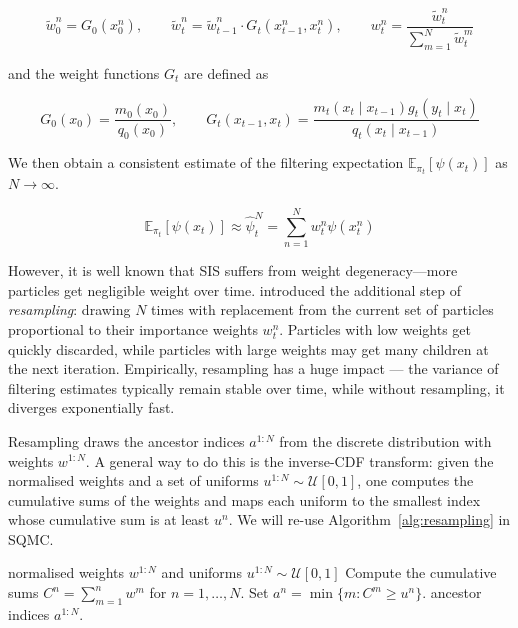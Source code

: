\begin{equation}
    \tilde{w}_0^n = G_0(x_0^n), \qquad \tilde{w}_t^n = \tilde{w}_{t-1}^n \cdot G_t(x_{t-1}^n, x_t^n), \qquad w_t^n = \frac{\tilde{w}_t^n}{\sum_{m=1}^N \tilde{w}_t^m} \nonumber
\end{equation}

and the weight functions $G_t$ are defined as 

\begin{equation}
    G_0(x_0) = \frac{m_0(x_0)}{q_0(x_0)}, \qquad  G_t(x_{t-1}, x_t) = \frac{m_t(x_t \mid x_{t-1}) g_t(y_t \mid x_t)}{q_t(x_t \mid x_{t-1})} \nonumber
\end{equation}

We then obtain a consistent estimate of the filtering expectation $\mathbb{E}_{\pi_t}[\psi(x_t)]$ as $N \to \infty$.

\begin{equation}
    \mathbb{E}_{\pi_t}[\psi(x_t)] \approx \hat{\psi}_t^N = \sum_{n=1}^N w_t^n \psi(x_t^n) \nonumber
\end{equation}

However, it is well known that SIS suffers from weight degeneracy---more particles get negligible weight over time. \citet{gordonsalmondsmith1993} introduced the additional step of \textit{resampling}: drawing $N$ times with replacement from the current set of particles proportional to their importance weights $w_t^n$. Particles with low weights get quickly discarded, while particles with large weights may get many children at the next iteration. Empirically, resampling has a huge impact --- the variance of filtering estimates typically remain stable over time, while without resampling, it diverges exponentially fast.

Resampling draws the ancestor indices $a^{1:N}$ from the discrete distribution with weights $w^{1:N}$. A general way to do this is the inverse-CDF transform: given the normalised weights and a set of uniforms $u^{1:N} \sim \mathcal{U}[0,1]$, one computes the cumulative sums of the weights and maps each uniform to the smallest index whose cumulative sum is at least $u^n$. We will re-use Algorithm~\ref{alg:resampling} in SQMC.

\begin{algorithm}[t]
\caption{Resampling}
\label{alg:resampling}
\begin{algorithmic}[1]
\Require normalised weights $w^{1:N}$ and uniforms $u^{1:N} \sim \mathcal{U}[0,1]$
\State Compute the cumulative sums $C^n = \sum_{m=1}^n w^m$ for $n = 1, \ldots, N$.
    \State Set $a^n = \min\{m : C^m \geq u^n\}$.
\EndFor
\State \Return ancestor indices $a^{1:N}$.
\end{algorithmic}
\end{algorithm}

